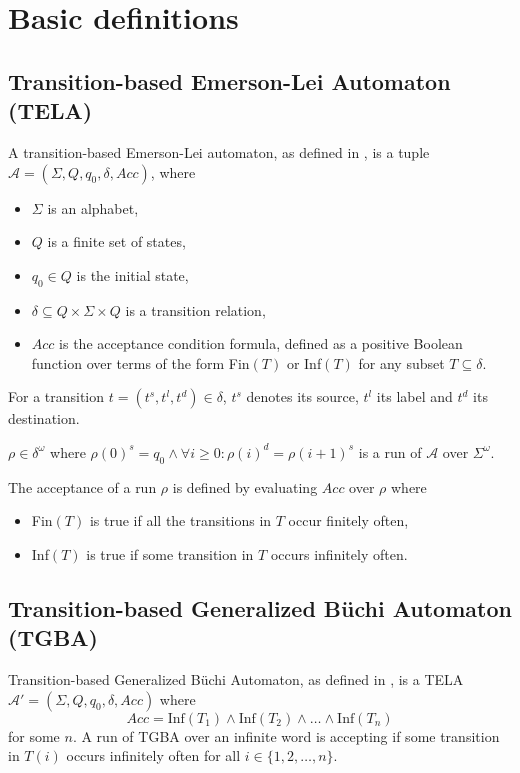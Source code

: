 \documentclass[
  digital, %
  twoside, %
  table,   %
  lof,     %
  lot,     %
]{fithesis3}
\begin{document}
\chapter{Basic definitions}

\section{Transition-based Emerson-Lei Automaton (TELA)} 
A transition-based Emerson-Lei automaton, as defined in \cite{bloemen2017}, is a tuple $\mathcal{A} = (\Sigma, Q, q_0, \delta, Acc)$, where
\begin{itemize}
  \item $\Sigma$ is an alphabet,
  \item $Q$ is a finite set of states,
  \item $q_0 \in Q$ is the initial state,
  \item $\delta \subseteq Q \times \Sigma \times Q$ is a transition relation,
  \item $Acc$ is the acceptance condition formula, defined as a positive Boolean function over terms of the form Fin$(T)$ or Inf$(T)$ for any subset $T \subseteq \delta$. %
\end{itemize}

For a transition $t = (t^s, t^l, t^d) \in \delta$, $t^s$ denotes its source, $t^l$ its label and $t^d$ its destination.

$\rho \in \delta^\omega$ where $\rho(0)^s = q_0 \wedge \forall i \geq 0 : \rho(i)^d = \rho(i + 1)^s$ is a run of $\mathcal{A}$ over $\Sigma^\omega$.

The acceptance of a run $\rho$ is defined by evaluating $Acc$ over $\rho$ where
\begin{itemize}
  \item Fin$(T)$ is true if all the transitions in $T$ occur finitely often, 
  \item Inf$(T)$ is true if some transition in $T$ occurs infinitely often.
\end{itemize}

\section{Transition-based Generalized Büchi Automaton (TGBA)}
Transition-based Generalized Büchi Automaton, as defined in \cite{bloemen2017}, is a TELA $\mathcal{A'} = (\Sigma, Q, q_0, \delta, Acc)$ where 
\begin{equation*}
  Acc = \text{Inf}(T_1) \wedge \text{Inf}(T_2) \wedge \dots \wedge \text{Inf}(T_n)
\end{equation*} 
for some $n$. A run of TGBA over an infinite word is accepting if some transition in $T(i)$ occurs infinitely often for all $i \in \{1, 2, \dots, n\}$. 
\end{document}
